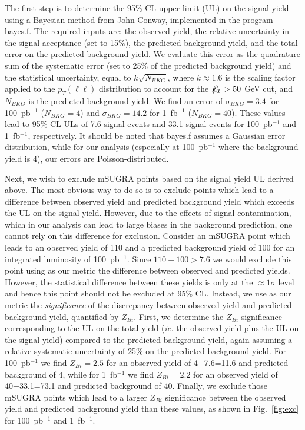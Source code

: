 The first  step is to  determine the 95\%  CL upper limit (UL)  on the
signal yield using a Bayesian  method from John Conway, implemented in
the program bayes.f. The required  inputs are: the observed yield, the
relative  uncertainty in  the  signal acceptance  (set  to 15\%),  the
predicted  background yield,  and  the total  error  on the  predicted
background yield. We evaluate this  error as the quadrature sum of the
systematic error (set  to 25\% of the predicted  background yield) and
the  statistical   uncertainty,  equal  to   $k\sqrt{N_{BKG}}$,  where
$k\approx1.6$ is  the scaling factor applied  to the $p_{T}(\ell\ell)$
distribution to  account for the  $E\!\!\!\!/_T>50~$GeV cut, and  $N_{BKG}$ is
the   predicted    background   yield.    We   find    an   error   of
$\sigma_{BKG}=3.4$     for     100~pb$^{-1}$     ($N_{BKG}=4$)     and
$\sigma_{BKG}=14.2$ for 1~fb$^{-1}$  ($N_{BKG}=40$). These values lead
to  95\% CL  ULs  of 7.6  signal  events and  33.1  signal events  for
100~pb$^{-1}$ and  1~fb$^{-1}$, respectively. It should  be noted that
bayes.f assumes a Gaussian  error distribution, while for our analysis
(especially  at 100~pb$^{-1}$ where  the background  yield is  4), our
errors are Poisson-distributed.

Next, we  wish to exclude mSUGRA  points based on the  signal yield UL
derived above.   The most obvious  way to do  so is to  exclude points
which  lead  to a  difference  between  observed  yield and  predicted
background yield  which exceeds the  UL on the signal  yield. However,
due to the effects of  signal contamination, which in our analysis can
lead to large biases in  the background prediction, one cannot rely on
this difference for exclusion. Consider an mSUGRA point which leads to
an observed yield  of 110 and a predicted background  yield of 100 for
an  integrated luminosity  of 100~pb$^{-1}$.   Since  $110-100>7.6$ we
would exclude  this point using  as our metric the  difference between
observed  and predicted  yields. However,  the  statistical difference
between these yields  is only at the $\approx1\sigma$  level and hence
this point should  not be excluded at 95\% CL. Instead,  we use as our
metric  the {\em  significance}  of the  discrepancy between  observed
yield and predicted background  yield, quantified by $Z_{Bi}$.  First,
we determine the $Z_{Bi}$ significance  corresponding to the UL on the
total yield ({\em  ie.}  the observed yield plus the  UL on the signal
yield) compared  to the predicted  background yield, again  assuming a
relative systematic  uncertainty of  25\% on the  predicted background
yield.  For  100~pb$^{-1}$ we find $Z_{Bi}=2.5$ for  an observed yield
of 4+7.6=11.6 and predicted background  of 4, while for 1~fb$^{-1}$ we
find $Z_{Bi}=2.2$ for an  observed yield of 40+33.1=73.1 and predicted
background of 40.  Finally, we  exclude those mSUGRA points which lead
to  a larger  $Z_{Bi}$  significance between  the  observed yield  and
predicted   background  yield   than   these  values,   as  shown   in
Fig.~\ref{fig:exc}   for 100~pb$^{-1}$  and
1~fb$^{-1}$.


